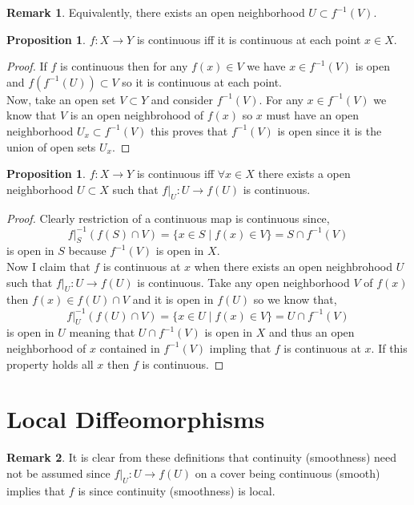 \documentclass[12pt]{extarticle}
\theoremstyle{definition}
\newtheorem{proposition}[theorem]{Proposition}
\newtheorem{remark}{Remark}
\begin{document}
\begin{remark}
Equivalently, there exists an open neighborhood $U \subset f^{-1}(V)$. 
\end{remark}

\begin{proposition}
$f : X \to Y$ is continuous iff it is continuous at each point $x \in X$.
\end{proposition}

\begin{proof}
If $f$ is continuous then for any $f(x) \in V$ we have $x \in f^{-1}(V)$ is open and $f(f^{-1}(U)) \subset V$ so it is continuous at each point. 
\bigskip\\
Now, take an open set $V \subset Y$ and consider $f^{-1}(V)$. For any $x \in f^{-1}(V)$ we know that $V$ is an open neighbrohood of $f(x)$ so $x$ must have an open neighborhood $U_x \subset f^{-1}(V)$ this proves that $f^{-1}(V)$ is open since it is the union of open sets $U_x$. 
\end{proof}

\begin{proposition}
$f : X \to Y$ is continuous iff $\forall x \in X$ there exists a open neighborhood $U \subset X$ such that $f|_U : U \to f(U)$ is continuous. 
\end{proposition}

\begin{proof}
Clearly restriction of a continuous map is continuous since,
\[ f|_S^{-1}(f(S) \cap V) = \{ x \in S \mid f(x) \in V \} = S \cap f^{-1}(V) \] is open in $S$ because $f^{-1}(V)$ is open in $X$.
\bigskip\\
Now I claim that $f$ is continuous at $x$ when there exists an open neighbrohood $U$ such that $f|_U : U \to f(U)$ is continuous. Take any open neighborhood $V$ of $f(x)$ then $f(x) \in f(U) \cap V$ and it is open in $f(U)$ so we know that,
\[ f|_U^{-1}(f(U) \cap V) = \{ x \in U \mid f(x) \in V \} = U \cap f^{-1}(V) \]
is open in $U$ meaning that $U \cap f^{-1}(V)$ is open in $X$ and thus an open neighborhood of $x$ contained in $f^{-1}(V)$ impling that $f$ is continuous at $x$. If this property holds all $x$ then $f$ is continuous.
\end{proof}

\section{Local Diffeomorphisms}

\begin{remark}
It is clear from these definitions that continuity (smoothness) need not be assumed since $f|_U : U \to f(U)$ on a cover being continuous (smooth) implies that $f$ is since continuity (smoothness) is local.
\end{remark}
\end{document}
